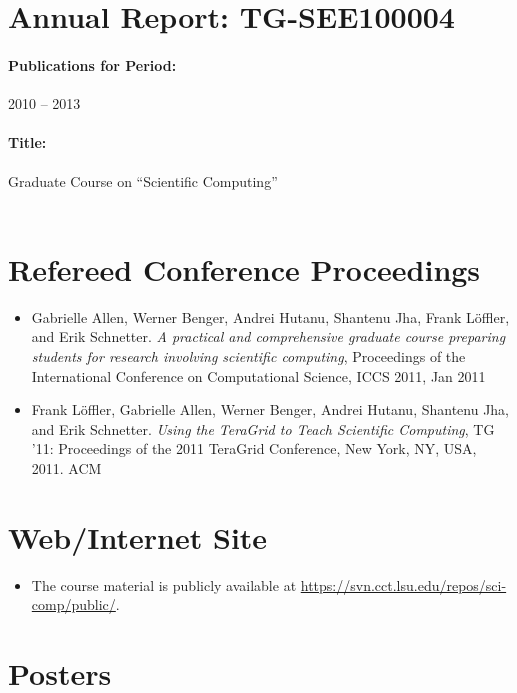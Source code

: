 \documentclass[11pt]{article}
\begin{document}
\section*{Annual Report: TG-SEE100004}

\paragraph{Publications for Period:}
2010 -- 2013

\paragraph{Title:} Graduate Course on ``Scientific Computing''\\\


\section{Refereed Conference Proceedings}

\begin{itemize}

\item Gabrielle Allen, Werner Benger, Andrei Hutanu, Shantenu Jha, Frank L{\"o}ffler,
  and Erik Schnetter.
  \emph{A practical and comprehensive graduate course preparing students for
    research involving scientific computing},
  Proceedings of the International Conference on Computational Science,
    ICCS 2011, Jan 2011

\item Frank L\"offler, Gabrielle Allen, Werner Benger, Andrei Hutanu, Shantenu Jha,
  and Erik Schnetter.
  \emph{Using the TeraGrid to Teach Scientific Computing},
  TG '11: Proceedings of the 2011 TeraGrid Conference, New York, NY, USA, 2011. ACM

\end{itemize}

\section{Web/Internet Site}

\begin{itemize}
 \item The course material is publicly available at \url{https://svn.cct.lsu.edu/repos/sci-comp/public/}.
\end{itemize}

\section{Posters}
\end{document}
